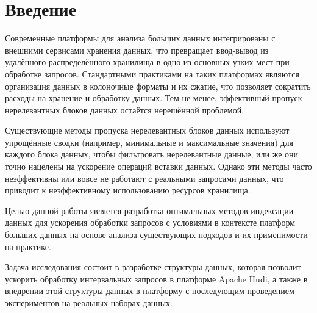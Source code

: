 \section*{Введение}

Современные платформы для анализа больших данных интегрированы с внешними сервисами хранения данных, что превращает ввод-вывод из удалённого распределённого хранилища в одно из основных узких мест при обработке запросов. Стандартными практиками на таких платформах являются организация данных в колоночные форматы и их сжатие, что позволяет сократить расходы на хранение и обработку данных. Тем не менее, эффективный пропуск нерелевантных блоков данных остаётся нерешённой проблемой.

Существующие методы пропуска нерелевантных блоков данных используют упрощённые сводки (например, минимальные и максимальные значения) для каждого блока данных, чтобы фильтровать нерелевантные данные, или же они точно нацелены на ускорение операций вставки данных. Однако эти методы часто неэффективны или вовсе не работают с реальными запросами данных, что приводит к неэффективному использованию ресурсов хранилища.

Целью данной работы является разработка оптимальных методов индексации данных для ускорения обработки запросов с условиями в контексте платформ больших данных на основе анализа существующих подходов и их применимости на практике.

Задача исследования состоит в разработке структуры данных, которая позволит ускорить обработку интервальных запросов в платформе Apache Hudi, а также в внедрении этой структуры данных в платформу с последующим проведением экспериментов на реальных наборах данных. \cite{tex, latex}
